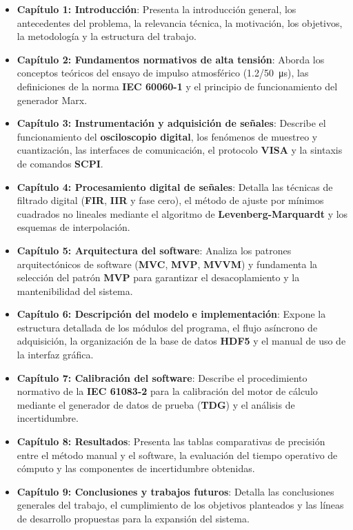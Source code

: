\begin{itemize}
    \item \textbf{Capítulo 1: Introducción}: Presenta la introducción general, los antecedentes del problema, la relevancia técnica, la motivación, los objetivos, la metodología y la estructura del trabajo.
    \item \textbf{Capítulo 2: Fundamentos normativos de alta tensión}: Aborda los conceptos teóricos del ensayo de impulso atmosférico (\qty[parse-numbers=false]{1.2/50}{\micro\second}), las definiciones de la norma \textbf{IEC 60060-1} \cite{iec60060_1} y el principio de funcionamiento del generador Marx.
    \item \textbf{Capítulo 3: Instrumentación y adquisición de señales}: Describe el funcionamiento del \textbf{osciloscopio digital}, los fenómenos de muestreo y cuantización, las interfaces de comunicación, el protocolo \textbf{VISA} y la sintaxis de comandos \textbf{SCPI}.
    \item \textbf{Capítulo 4: Procesamiento digital de señales}: Detalla las técnicas de filtrado digital (\textbf{FIR}, \textbf{IIR} y fase cero), el método de ajuste por mínimos cuadrados no lineales mediante el algoritmo de \textbf{Levenberg-Marquardt} y los esquemas de interpolación.
    \item \textbf{Capítulo 5: Arquitectura del software}: Analiza los patrones arquitectónicos de software (\textbf{MVC}, \textbf{MVP}, \textbf{MVVM}) y fundamenta la selección del patrón \textbf{MVP} para garantizar el desacoplamiento y la mantenibilidad del sistema.
    \item \textbf{Capítulo 6: Descripción del modelo e implementación}: Expone la estructura detallada de los módulos del programa, el flujo asíncrono de adquisición, la organización de la base de datos \textbf{HDF5} y el manual de uso de la interfaz gráfica.
    \item \textbf{Capítulo 7: Calibración del software}: Describe el procedimiento normativo de la \textbf{IEC 61083-2} \cite{iec61083_2} para la calibración del motor de cálculo mediante el generador de datos de prueba (\textbf{TDG}) y el análisis de incertidumbre.
    \item \textbf{Capítulo 8: Resultados}: Presenta las tablas comparativas de precisión entre el método manual y el software, la evaluación del tiempo operativo de cómputo y las componentes de incertidumbre obtenidas.
    \item \textbf{Capítulo 9: Conclusiones y trabajos futuros}: Detalla las conclusiones generales del trabajo, el cumplimiento de los objetivos planteados y las líneas de desarrollo propuestas para la expansión del sistema.
\end{itemize}

